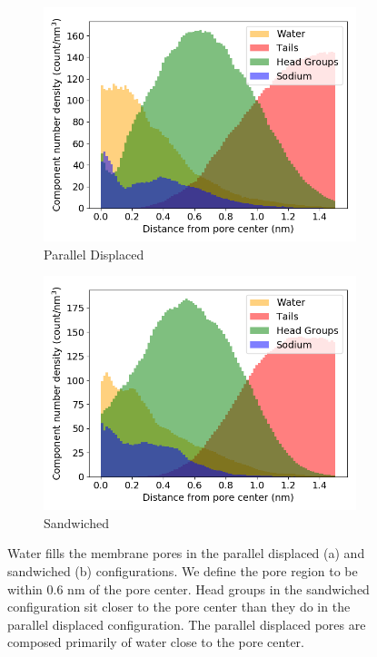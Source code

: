 \documentclass[journal=jpcbfk,manusciprt=article]{achemso}
\begin{document}
  \begin{figure}
  \centering 
  \begin{subfigure}{0.45\textwidth}
        \includegraphics[width=1\linewidth]{offset_solvated_density.png}
        \caption{Parallel Displaced}
        \label{fig:offset_solvated_density}
  \end{subfigure}
  \begin{subfigure}{0.45\textwidth}
        \includegraphics[width=1\linewidth]{layered_solvated_density.png}
        \caption{Sandwiched}
        \label{fig:layered_solvated_density}
  \end{subfigure}
  \caption{Water fills the membrane pores in the parallel displaced (a) and
	  sandwiched (b) configurations. We define the pore region to be within 0.6 nm of
	  the pore center. Head groups in the sandwiched configuration sit closer to the
	  pore center than they do in the parallel displaced configuration. The parallel
	  displaced pores are composed primarily of water close to the pore center.}
  \label{fig:water_density}
  \end{figure}
\end{document}
